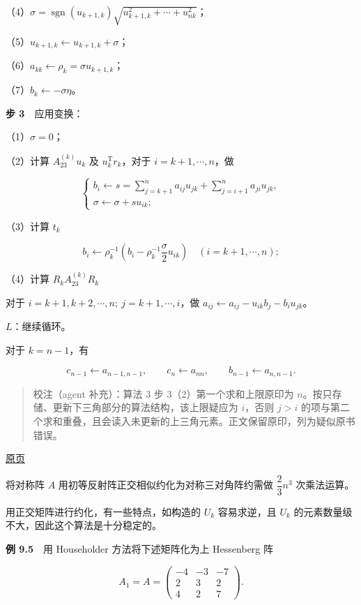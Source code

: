 \documentclass[
  10pt,
  fontset=fandol]{ctexart}
\begin{document}
（4）\(\sigma=\operatorname{sgn}(u_{k+1,k})\sqrt{u_{k+1,k}^2+\cdots+u_{nk}^2}\)；

（5）\(u_{k+1,k}\leftarrow u_{k+1,k}+\sigma\)；

（6）\(a_{kk}\leftarrow\rho_k=\sigma u_{k+1,k}\)；

（7）\(b_k\leftarrow-\sigma\eta\)。

\textbf{步 3}　应用变换：

（1）\(\sigma=0\)；

（2）计算 \(A_{23}^{(k)}u_k\) 及 \(u_k^{\mathrm T}r_k\)，对于 \(i=k+1,\cdots,n\)，做

\[
\begin{cases}
b_i\leftarrow s=\displaystyle\sum_{j=k+1}^{n}a_{ij}u_{jk}+\displaystyle\sum_{j=i+1}^{n}a_{ji}u_{jk},\\
\sigma\leftarrow\sigma+su_{ik};
\end{cases}
\]

（3）计算 \(t_k\)

\[
b_i\leftarrow\rho_k^{-1}\left(b_i-\rho_k^{-1}\frac\sigma2u_{ik}\right)
\quad(i=k+1,\cdots,n);
\]

（4）计算 \(R_kA_{23}^{(k)}R_k\)

对于 \(i=k+1,\allowbreak k+2,\allowbreak \cdots,\allowbreak n;\ j=k+1,\allowbreak \cdots,\allowbreak i\)，做 \(a_{ij}\leftarrow a_{ij}-u_{ik}b_j-b_iu_{jk}\)。

\(L\)：继续循环。

对于 \(k=n-1\)，有

\[
c_{n-1}\leftarrow a_{n-1,n-1},\qquad c_n\leftarrow a_{nn},\qquad b_{n-1}\leftarrow a_{n,n-1}.
\]

\begin{quote}
校注（agent 补充）：算法 3 步 3（2）第一个求和上限原印为 \(n\)。按只存储、更新下三角部分的算法结构，该上限疑应为 \(i\)，否则 \(j>i\) 的项与第二个求和重叠，且会读入未更新的上三角元素。正文保留原印，列为疑似原书错误。
\end{quote}

\href{../../source-images/pdf-249.jpeg}{原页}

将对称阵 \(A\) 用初等反射阵正交相似约化为对称三对角阵约需做 \(\dfrac23n^3\) 次乘法运算。

用正交矩阵进行约化，有一些特点，如构造的 \(U_k\) 容易求逆，且 \(U_k\) 的元素数量级不大，因此这个算法是十分稳定的。

\textbf{例 9.5}　用 Householder 方法将下述矩阵化为上 Hessenberg 阵

\[
A_1=A=\begin{pmatrix}-4&-3&-7\\2&3&2\\4&2&7\end{pmatrix}.
\]
\end{document}
